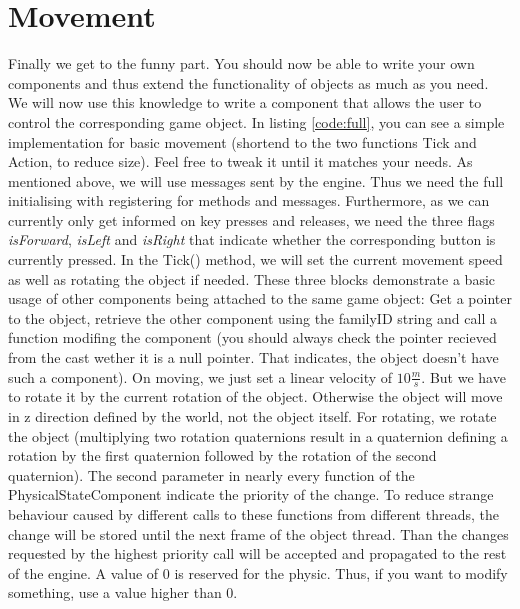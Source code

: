\documentclass{article}
\begin{document}
\section{Movement}

Finally we get to the funny part. You should now be able to write your own components and thus extend the functionality of objects as much as you need. We will now use this knowledge to write a component that allows the user to control the corresponding game object. In listing \ref{code:full}, you can see a simple implementation for basic movement (shortend to the two functions Tick and Action, to reduce size). Feel free to tweak it until it matches your needs.\newline
As mentioned above, we will use messages sent by the engine. Thus we need the full initialising with registering for methods and messages. Furthermore, as we can currently only get informed on key presses and releases, we need the three flags \textit{isForward}, \textit{isLeft} and \textit{isRight} that indicate whether the corresponding button is currently pressed.\newline
In the Tick() method, we will set the current movement speed as well as rotating the object if needed. These three blocks demonstrate a basic usage of other components being attached to the same game object: Get a pointer to the object, retrieve the other component using the familyID string and call a function modifing the component (you should always check the pointer recieved from the cast wether it is a null pointer. That indicates, the object doesn't have such a component). On moving, we just set a linear velocity of $10\frac{m}{s}$. But we have to rotate it by the current rotation of the object. Otherwise the object will move in z direction defined by the world, not the object itself. For rotating, we rotate the object (multiplying two rotation quaternions result in a quaternion defining a rotation by the first quaternion followed by the rotation of the second quaternion). The second parameter in nearly every function of the PhysicalStateComponent indicate the priority of the change. To reduce strange behaviour caused by different calls to these functions from different threads, the change will be stored until the next frame of the object thread. Than the changes requested by the highest priority call will be accepted and propagated to the rest of the engine. A value of 0 is reserved for the physic. Thus, if you want to modify something, use a value higher than 0.\newline
\end{document}

